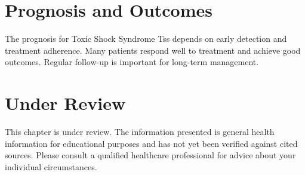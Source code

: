 \section*{Prognosis and Outcomes}
The prognosis for Toxic Shock Syndrome Tss depends on early detection and treatment adherence. Many patients respond well to treatment and achieve good outcomes. Regular follow-up is important for long-term management.
\section*{Under Review}
This chapter is under review. The information presented is general health information for educational purposes and has not yet been verified against cited sources. Please consult a qualified healthcare professional for advice about your individual circumstances.


\clearpage
